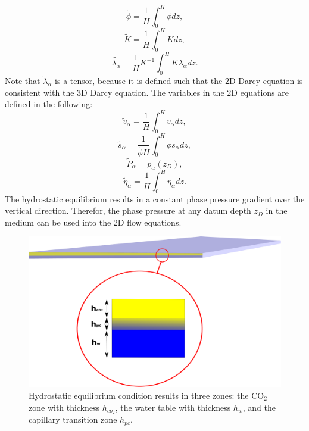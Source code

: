 \begin{equation}
\tilde{\phi}=\frac{1}{H}\int_0^H\phi dz,
\label{eq:phi_}
\end{equation}
\begin{equation}
\tilde{K}=\frac{1}{H}\int_0^H K dz,
\label{eq:K_}
\end{equation}
\begin{equation}
\tilde{\lambda_{\alpha}}=\frac{1}{H}K^{-1}\int_0^HK\lambda_{\alpha} dz.
\label{eq:lambda_}
\end{equation} Note that $\tilde\lambda_\alpha$ is a tensor, because it is
defined such that the $2\mbox{D}$ Darcy equation is consistent with the
$3\mbox{D}$ Darcy equation. The variables in the $2\mbox{D}$ equations are
defined in the following:
\begin{equation}
\tilde{v}_\alpha=\frac{1}{H}\int_0^H v_\alpha dz,
\label{eq:v_}
\end{equation}
\begin{equation}
\tilde{s}_\alpha=\frac{1}{\tilde{\phi}H}\int_0^H \phi s_\alpha dz,
\label{eq:s_}
\end{equation}
\begin{equation}
\tilde{P}_\alpha=p_{\alpha}(z_D),
\label{eq:p_}
\end{equation}
\begin{equation}
\tilde{\eta}_\alpha=\frac{1}{H}\int_0^H \eta_\alpha dz.
\label{eq:eta_}
\end{equation} The hydrostatic equilibrium results in a constant phase pressure
gradient over the vertical direction. Therefor, the phase pressure at any datum
depth $z_D$ in the medium can be used into the $2\mbox{D}$ flow equations. 


\begin{figure}[thb]
 \centering{}
 \includegraphics[width=1\linewidth]{./figurer/VACOL}
 \caption{Hydrostatic equilibrium condition results in three zones:
the $\mbox{CO}_2$ zone with thickness $h_{co_2}$, the water table with thickness
$h_{w}$, and the capillary transition zone $h_{pc}$.}
 \label{fig:VC}
\end{figure}


